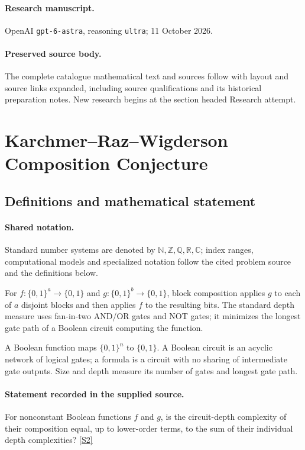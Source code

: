 \documentclass[11pt]{article}
\begin{document}
\paragraph{Research manuscript.} OpenAI \texttt{gpt-6-astra}, reasoning \texttt{ultra}; 11 October 2026.
\paragraph{Preserved source body.} The complete catalogue mathematical text and sources follow with layout and source links expanded, including source qualifications and its historical preparation notes. New research begins at the section headed Research attempt.

\section{Karchmer–Raz–Wigderson Composition Conjecture}\label{statement}

\subsection{Definitions and mathematical statement}

\paragraph{Shared notation.}Standard number systems are denoted by $\mathbb N,\mathbb Z,\mathbb Q,\mathbb R,\mathbb C$; index ranges, computational models and specialized notation follow the cited problem source and the definitions below.


For $f:\{0,1\}^a\to\{0,1\}$ and $g:\{0,1\}^b\to\{0,1\}$, block composition applies $g$ to each of $a$ disjoint blocks and then applies $f$ to the resulting bits. The standard depth measure uses fan-in-two AND/OR gates and NOT gates; it minimizes the longest gate path of a Boolean circuit computing the function.

A Boolean function maps $\{0,1\}^n$ to $\{0,1\}$. A Boolean circuit is an acyclic network of logical gates; a formula is a circuit with no sharing of intermediate gate outputs. Size and depth measure its number of gates and longest gate path.
\paragraph{Statement recorded in the supplied source.}
For nonconstant Boolean functions $f$ and $g$, is the circuit-depth complexity of their composition equal, up to lower-order terms, to the sum of their individual depth complexities? \href{https://doi.org/10.4171/owr/2018/51}{[S2]}
\end{document}

